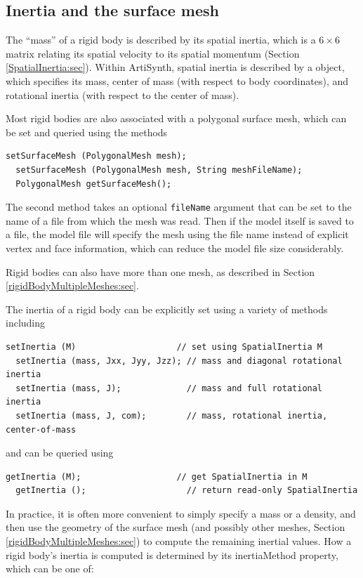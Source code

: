 \subsection{Inertia and the surface mesh}
\label{rigidBodyInertia:sec}

The ``mass'' of a rigid body is described by its spatial inertia,
which is a $6 \times 6$ matrix relating its spatial velocity to its
spatial momentum (Section \ref{SpatialInertia:sec}).  Within
ArtiSynth, spatial inertia is described by a
 object, which
specifies its mass, center of mass (with respect to body coordinates),
and rotational inertia (with respect to the center of mass).

Most rigid bodies are also associated with a polygonal surface mesh,
which can be set and queried using the methods
\begin{lstlisting}[]
  setSurfaceMesh (PolygonalMesh mesh);
  setSurfaceMesh (PolygonalMesh mesh, String meshFileName);
  PolygonalMesh getSurfaceMesh();
\end{lstlisting}
%
The second method takes an optional {\tt fileName} argument that can
be set to the name of a file from which the mesh was read. Then if the
model itself is saved to a file, the model file will specify the mesh
using the file name instead of explicit vertex and face information,
which can reduce the model file size considerably.

Rigid bodies can also have more than one mesh, as described
in Section \ref{rigidBodyMultipleMeshes:sec}.

The inertia of a rigid body can be explicitly set using a variety
of methods including
\begin{lstlisting}[]
  setInertia (M)                    // set using SpatialInertia M
  setInertia (mass, Jxx, Jyy, Jzz); // mass and diagonal rotational inertia
  setInertia (mass, J);             // mass and full rotational inertia
  setInertia (mass, J, com);        // mass, rotational inertia, center-of-mass
\end{lstlisting}
%
and can be queried using 
\begin{lstlisting}[]
  getInertia (M);                   // get SpatialInertia in M
  getInertia ();                    // return read-only SpatialInertia
\end{lstlisting}
%

In practice, it is often more convenient to simply specify a mass or a
density, and then use the geometry of the surface mesh (and possibly
other meshes, Section \ref{rigidBodyMultipleMeshes:sec}) to compute
the remaining inertial values. How a rigid body's inertia is computed
is determined by its {\sf inertiaMethod} property, which can be one of:

